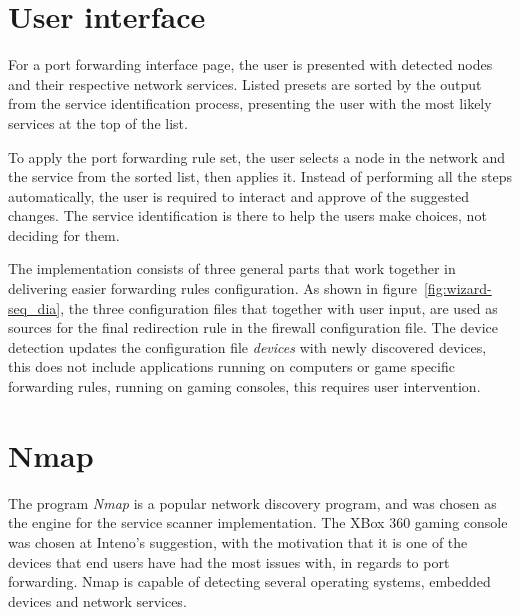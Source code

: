 \documentclass[g5paper,11pt]{kth-bcs}
\begin{document}
   \section{User interface}
For a port forwarding interface page, the user is presented with detected nodes and their respective network services.
Listed presets are sorted by the output from the service identification process, presenting the user with the most likely services at the top of the list.

To apply the port forwarding rule set, the user selects a node in the network and the service from the sorted list, then applies it.
Instead of performing all the steps automatically, the user is required to interact and approve of the suggested changes.
The service identification is there to help the users make choices, not deciding for them.

The implementation consists of three general parts that work together in delivering easier forwarding rules configuration.
As shown in figure~\ref{fig:wizard-seq_dia}, the three configuration files that together with user input, are used as sources for the final redirection rule in the firewall configuration file.
The device detection updates the configuration file \emph{devices} with newly discovered devices, this does not include applications running on computers or game specific forwarding rules, running on gaming consoles, this requires user intervention.


\section{Nmap}
The program \emph{Nmap} is a popular network discovery program, and was chosen as the engine for the service scanner implementation.
The XBox 360 gaming console was chosen at Inteno's suggestion, with the motivation that it is one of the devices that end users have had the most issues with, in regards to port forwarding.
Nmap is capable of detecting several operating systems, embedded devices and network services.
\end{document}
